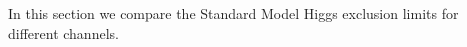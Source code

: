 In this section we compare the Standard Model Higgs exclusion limits
for different channels.

\begin{figure}[!hbtp]

\centering
{}
\caption{}
\label{fig:ul_cutbased_subchannels}
\end{figure}

